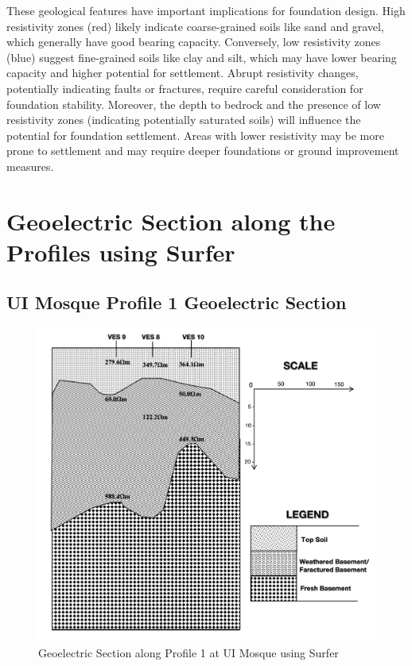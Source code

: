 \documentclass[12pt,a4paper]{report}
\begin{document}
These geological features have important implications for foundation design. High resistivity zones (red) likely indicate coarse-grained soils like sand and gravel, which generally have good bearing capacity. Conversely, low resistivity zones (blue) suggest fine-grained soils like clay and silt, which may have lower bearing capacity and higher potential for settlement. Abrupt resistivity changes, potentially indicating faults or fractures, require careful consideration for foundation stability. Moreover, the depth to bedrock and the presence of low resistivity zones (indicating potentially saturated soils) will influence the potential for foundation settlement. Areas with lower resistivity may be more prone to settlement and may require deeper foundations or ground improvement measures.

\section{Geoelectric Section along the Profiles using Surfer}

\subsection{UI Mosque Profile 1 Geoelectric Section}
\begin{figure}[H]
    \centering
    \includegraphics[width=1.0\textwidth]{UI_Mosque_Profile1.png}
    \caption{Geoelectric Section along Profile 1 at UI Mosque using Surfer}
    \label{fig:UI_Mosque_Surfer_Profile_1}
\end{figure}
\end{document}
